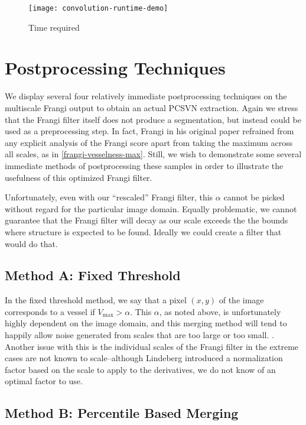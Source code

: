 \begin{figure}
  \texttt{[image: convolution-runtime-demo]}
  \caption{Time required}
\end{figure}

\section{Postprocessing Techniques}
We display several four relatively immediate postprocessing techniques on the multiscale Frangi output to obtain an actual PCSVN extraction. Again we stress that the Frangi filter itself does not produce a segmentation, but instead could be used as a preprocessing step. In fact, Frangi in his original paper \cite{frangi-paper} refrained from any explicit analysis of the Frangi score apart from taking the maximum across all scales, as in \cref{frangi-vesselness-max}. Still, we wish to demonstrate some several immediate methods of postprocessing these samples in order to illustrate the usefulness of this optimized Frangi filter. 

Unfortunately, even with our ``rescaled'' Frangi filter, this $\alpha$ cannot be picked without regard for the particular image domain. Equally problematic, we cannot guarantee that the Frangi filter will decay as our scale exceeds the the bounds where structure is expected to be found. Ideally we could create a filter that would do that.

\subsection{Method A: Fixed Threshold}

In the fixed threshold method, we say that a pixel $(x,y)$ of the image corresponds to a vessel if
$V_{\max} >  \alpha$. This $\alpha$, as noted above, is unfortunately highly dependent on the image domain, and this merging method will tend to happily allow noise generated from scales that are too large or too small. . Another issue with this is the individual scales of the Frangi filter in the extreme cases are not known to scale--although Lindeberg introduced a normalization factor based on the scale to apply to the derivatives, we do not know of an optimal factor to use.


\subsection{Method B: Percentile Based Merging}

